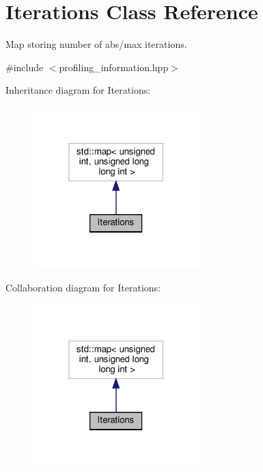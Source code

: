 \hypertarget{classIterations}{}\section{Iterations Class Reference}
\label{classIterations}


Map storing number of abs/max iterations.  




{\ttfamily \#include $<$profiling\+\_\+information.\+hpp$>$}



Inheritance diagram for Iterations\+:
\nopagebreak
\begin{figure}[H]
\begin{center}
\leavevmode
\includegraphics[width=183pt]{dd/d86/classIterations__inherit__graph}
\end{center}
\end{figure}


Collaboration diagram for Iterations\+:
\nopagebreak
\begin{figure}[H]
\begin{center}
\leavevmode
\includegraphics[width=183pt]{d0/d0c/classIterations__coll__graph}
\end{center}
\end{figure}


